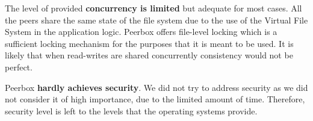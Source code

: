 The level of provided \textbf{concurrency is limited} but adequate for most cases. All the peers share the same state of the file system due to the use of the Virtual File System in the application logic. Peerbox offers file-level locking which is a sufficient locking mechanism for the purposes that it is meant to be used. It is likely that when read-writes are shared concurrently consistency would not be perfect. 


Peerbox \textbf{hardly achieves security}. We did not try to address security as we did not consider it of high importance, due to the limited amount of time. Therefore, security level is left to the levels that the operating systems provide. 